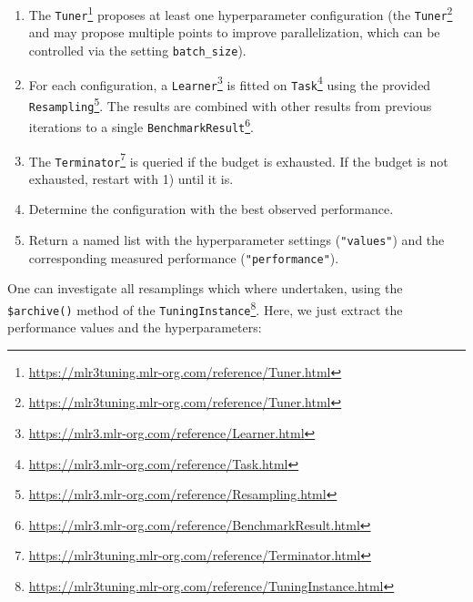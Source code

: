 \documentclass[12pt,]{scrbook}
\newenvironment{Shaded}{}{}
\newcommand{\KeywordTok}[1]{\textcolor[rgb]{0.00,0.00,1.00}{#1}}
\newcommand{\NormalTok}[1]{#1}
\newcommand{\OperatorTok}[1]{#1}
\newcommand{\StringTok}[1]{\textcolor[rgb]{0.00,0.50,0.50}{#1}}
\providecommand{\tightlist}{%
  \setlength{\itemsep}{0pt}\setlength{\parskip}{0pt}}
\renewcommand{\href}[2]{#2\footnote{\url{#1}}}
\begin{document}
\begin{enumerate}
\def\labelenumi{\arabic{enumi}.}
\tightlist
\item
  The \href{https://mlr3tuning.mlr-org.com/reference/Tuner.html}{\texttt{Tuner}} proposes at least one hyperparameter configuration (the \href{https://mlr3tuning.mlr-org.com/reference/Tuner.html}{\texttt{Tuner}} and may propose multiple points to improve parallelization, which can be controlled via the setting \texttt{batch\_size}).
\item
  For each configuration, a \href{https://mlr3.mlr-org.com/reference/Learner.html}{\texttt{Learner}} is fitted on \href{https://mlr3.mlr-org.com/reference/Task.html}{\texttt{Task}} using the provided \href{https://mlr3.mlr-org.com/reference/Resampling.html}{\texttt{Resampling}}.
  The results are combined with other results from previous iterations to a single \href{https://mlr3.mlr-org.com/reference/BenchmarkResult.html}{\texttt{BenchmarkResult}}.
\item
  The \href{https://mlr3tuning.mlr-org.com/reference/Terminator.html}{\texttt{Terminator}} is queried if the budget is exhausted.
  If the budget is not exhausted, restart with 1) until it is.
\item
  Determine the configuration with the best observed performance.
\item
  Return a named list with the hyperparameter settings (\texttt{"values"}) and the corresponding measured performance (\texttt{"performance"}).
\end{enumerate}

\begin{Shaded}
\end{Shaded}

One can investigate all resamplings which where undertaken, using the \texttt{\$archive()} method of the \href{https://mlr3tuning.mlr-org.com/reference/TuningInstance.html}{\texttt{TuningInstance}}.
Here, we just extract the performance values and the hyperparameters:
\end{document}
